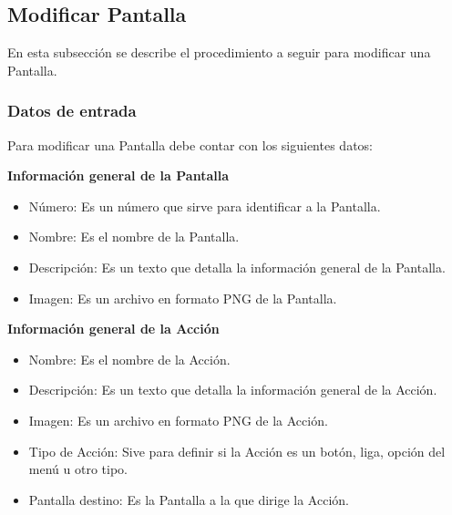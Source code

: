 \subsection{Modificar Pantalla}
En esta subsección se describe el procedimiento a seguir para modificar una Pantalla.

\subsubsection{Datos de entrada}
\begin{description}
	\item Para modificar una Pantalla debe contar con los siguientes datos: \hspace{10pt}
	\begin{description}
	    \item \textbf{Información general de la Pantalla}
	    \begin{itemize}
		  \item Número: Es un número que sirve para identificar a la Pantalla.
		  \item Nombre: Es el nombre de la Pantalla.
		  \item Descripción: Es un texto que detalla la información general de la Pantalla.
		  \item Imagen: Es un archivo en formato PNG de la Pantalla.
	    \end{itemize}
	    \item \textbf{Información general de la Acción}
	    \begin{itemize}
		  \item Nombre: Es el nombre de la Acción.
		  \item Descripción: Es un texto que detalla la información general de la Acción.
		  \item Imagen: Es un archivo en formato PNG de la Acción.
		  \item Tipo de Acción: Sive para definir si la Acción es un botón, liga, opción del menú u otro tipo.
		  \item Pantalla destino: Es la Pantalla a la que dirige la Acción.
	    \end{itemize}
	 \end{description}
\end{description}

